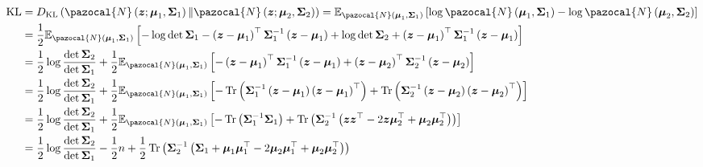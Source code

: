 \begin{align}
    \mathrm{KL} &= \KL{\pazocal{N}\left(\boldsymbol{z}; \boldsymbol{\mu}_1,\boldsymbol{\Sigma}_1  \right)}{\pazocal{N}\left(\boldsymbol{z}; \boldsymbol{\mu}_2,\boldsymbol{\Sigma}_2  \right)}  = \mathbb{E}_{\pazocal{N}\left(\boldsymbol{\mu}_1,\boldsymbol{\Sigma}_1\right)}\left[\log\pazocal{N}\left(\boldsymbol{\mu}_1,\boldsymbol{\Sigma}_1\right) - \log\pazocal{N}\left(\boldsymbol{\mu}_2,\boldsymbol{\Sigma}_2\right) \right]  
    \\
    &= \frac{1}{2}\mathbb{E}_{\pazocal{N}\left(\boldsymbol{\mu}_1,\boldsymbol{\Sigma}_1\right)}\left[-\log\det\boldsymbol{\Sigma}_1 - \left(\boldsymbol{z} - \boldsymbol{\mu}_1\right)^\top\boldsymbol{\Sigma}^{-1}_1\left(\boldsymbol{z}-\boldsymbol{\mu}_1\right) + \log\det\boldsymbol{\Sigma}_2+\left(\boldsymbol{z} - \boldsymbol{\mu}_1\right)^\top\boldsymbol{\Sigma}^{-1}_1\left(\boldsymbol{z}-\boldsymbol{\mu}_1\right) \right] \\
    &= \frac{1}{2}\log\frac{\det\boldsymbol{\Sigma}_2}{\det\boldsymbol{\Sigma}_1} + \frac{1}{2}\mathbb{E}_{\pazocal{N}\left(\boldsymbol{\mu}_1,\boldsymbol{\Sigma}_1\right)} \left[-\left(\boldsymbol{z} - \boldsymbol{\mu}_1\right)^\top\boldsymbol{\Sigma}^{-1}_1\left(\boldsymbol{z}-\boldsymbol{\mu}_1\right) + \left(\boldsymbol{z} -\boldsymbol{\mu}_2\right)^\top\boldsymbol{\Sigma}^{-1}_2\left(\boldsymbol{z}-\boldsymbol{\mu}_2\right)\right]
    \\
    &= \frac{1}{2}\log\frac{\det\boldsymbol{\Sigma}_2}{\det\boldsymbol{\Sigma}_1} + \frac{1}{2}\mathbb{E}_{\pazocal{N}\left(\boldsymbol{\mu}_1,\boldsymbol{\Sigma}_1\right)} \left[-\Tr\left(\boldsymbol{\Sigma}_1^{-1}\left(\boldsymbol{z} - \boldsymbol{\mu}_1\right)\left(\boldsymbol{z} - \boldsymbol{\mu}_1\right)^\top\right) + \Tr\left(\boldsymbol{\Sigma}_2^{-1}\left(\boldsymbol{z} - \boldsymbol{\mu}_2\right)\left(\boldsymbol{z} - \boldsymbol{\mu}_2\right)^\top\right) \right]
    \\
    &= \frac{1}{2}\log\frac{\det\boldsymbol{\Sigma}_2}{\det\boldsymbol{\Sigma}_1} + \frac{1}{2}\mathbb{E}_{\pazocal{N}\left(\boldsymbol{\mu}_1,\boldsymbol{\Sigma}_1\right)} \left[-\Tr\left(\boldsymbol{\Sigma}_1^{-1}\boldsymbol{\Sigma}_1\right) +  \Tr\left(\boldsymbol{\Sigma}_2^{-1}\left(\bz\bz^\top - 2\bz\boldsymbol{\mu}_2^\top + \boldsymbol{\mu}_2\boldsymbol{\mu}_2^\top \right) \right)\right] 
    \\
    &= \frac{1}{2}\log\frac{\det\boldsymbol{\Sigma}_2}{\det\boldsymbol{\Sigma}_1} - \frac{1}{2}n + \frac{1}{2}\Tr\left(\boldsymbol{\Sigma}_2^{-1}\left(\boldsymbol{\Sigma}_1 +\boldsymbol{\mu}_1\boldsymbol{\mu}_1^\top - 2\boldsymbol{\mu}_2\boldsymbol{\mu}_1^\top  + \boldsymbol{\mu}_2\boldsymbol{\mu}_2^\top \right)\right)

\end{align}
